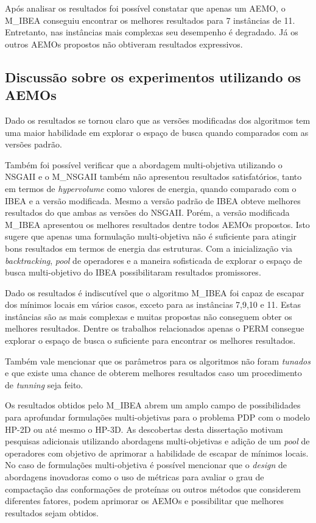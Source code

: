Após analisar os resultados foi possível constatar que apenas um AEMO, o M\_IBEA conseguiu encontrar os melhores resultados para 7 instâncias de 11. Entretanto, nas instâncias mais complexas seu desempenho é degradado. Já os outros AEMOs propostos não obtiveram resultados expressivos.

\subsection{Discussão sobre os experimentos utilizando os AEMOs}

Dado os resultados se tornou claro que as versões modificadas dos algoritmos tem uma maior habilidade em explorar o espaço de busca quando comparados com as versões padrão.  

Também foi possível verificar que a abordagem multi-objetiva utilizando o NSGAII e o M\_NSGAII também não apresentou resultados satisfatórios, tanto em termos de \textit{hypervolume} como valores de energia,  quando comparado com o IBEA e a versão modificada. Mesmo a versão padrão de IBEA obteve melhores resultados do que ambas as versões do NSGAII. Porém, a versão modificada M\_IBEA apresentou os melhores resultados dentre todos AEMOs propostos. Isto sugere que apenas uma formulação multi-objetiva não é suficiente para atingir bons resultados em termos de energia das estruturas. Com a inicialização via \textit{backtracking}, \textit{pool} de operadores e a maneira sofisticada de explorar o espaço de busca multi-objetivo do IBEA  possibilitaram resultados promissores.

Dado os resultados é indiscutível que o algoritmo M\_IBEA foi capaz de escapar dos mínimos locais em vários casos, exceto para as instâncias 7,9,10 e 11. Estas instâncias são as mais complexas e muitas propostas não conseguem obter os melhores resultados. Dentre  os trabalhos relacionados apenas o PERM consegue  explorar o espaço de busca o suficiente para encontrar os melhores resultados.

Também vale mencionar que os parâmetros para os algoritmos não foram \textit{tunados} e que existe uma chance de obterem melhores resultados caso um procedimento de \textit{tunning} seja feito.

Os resultados obtidos pelo M\_IBEA abrem um amplo campo de possibilidades para aprofundar formulações multi-objetivas para o problema PDP com o modelo HP-2D ou até mesmo o HP-3D. As descobertas desta dissertação motivam pesquisas adicionais utilizando abordagens multi-objetivas e adição de um \textit{pool} de operadores com objetivo de aprimorar a habilidade de escapar de mínimos locais. No caso de formulações multi-objetiva é possível mencionar que o \textit{design} de abordagens inovadoras como o uso de métricas para avaliar o grau de compactação das conformações de proteínas ou outros métodos que considerem diferentes fatores, podem aprimorar os AEMOs e possibilitar que melhores resultados sejam obtidos.



